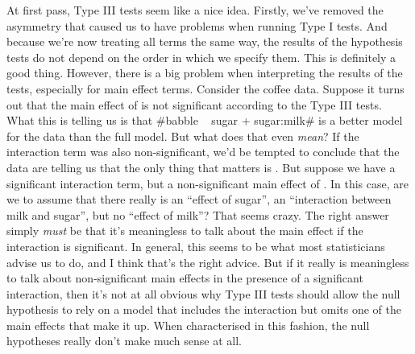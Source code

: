 At first pass, Type III tests seem like a nice idea. Firstly, we've removed the asymmetry that caused us to have problems when running Type I tests. And because we're now treating all terms the same way, the results of the hypothesis tests do not depend on the order in which we specify them. This is definitely a good thing. However, there is a big problem when interpreting the results of the tests, especially for main effect terms. Consider the coffee data. Suppose it turns out that the main effect of  is not significant according to the Type III tests. What this is telling us is that \rtextverb#babble ~ sugar + sugar:milk# is a better model for the data than the full model. But what does that even {\it mean}? If the interaction term  was also non-significant, we'd be tempted to conclude that the data are telling us that the only thing that matters is . But suppose we have a significant interaction term, but a non-significant main effect of . In this case, are we to assume that there really is an ``effect of sugar'', an ``interaction between milk and sugar'', but no ``effect of milk''? That seems crazy. The right answer simply {\it must} be that it's meaningless to talk about the main effect if the interaction is significant. In general, this seems to be what most statisticians advise us to do, and I think that's the right advice. But if it really is meaningless to talk about non-significant main effects in the presence of a significant interaction, then it's not at all obvious why Type III tests should allow the null hypothesis to rely on a model that includes the interaction but omits one of the main effects that make it up. When characterised in this fashion, the null hypotheses really don't make much sense at all. 

